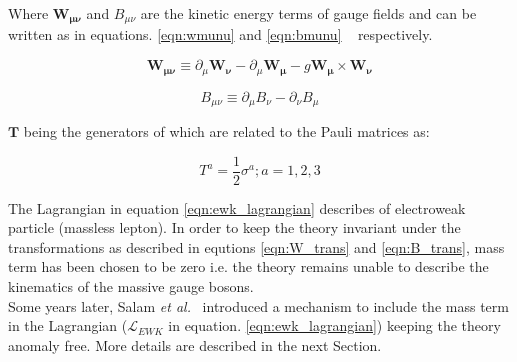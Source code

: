 Where $\mathbf{W_{\mu\nu}}$ and $B_{\mu\nu}$ are the kinetic energy terms of gauge fields and can be written as in equations. \ref{eqn:wmunu} and \ref{eqn:bmunu} ~ respectively.

\begin{equation}
        \mathbf{W_{\mu\nu}} \equiv \partial_{\mu}\mathbf{W_{\nu}}- \partial_{\mu}\mathbf{W_{\mu}} -g\mathbf{W_{\mu}}\times \mathbf{W_{\nu}}   %
\label{eqn:wmunu}
\end{equation}

\begin{equation}
        B_{\mu\nu} \equiv  \partial_{\mu} B_{\nu} - \partial_{\nu} B_{\mu}   %
\label{eqn:bmunu}
\end{equation}

$\mathbf{T}$ being the generators of \sutwo which are related to the Pauli matrices as:

\begin{equation}
	T^{a}=\frac{1}{2}\sigma^{a} ; a=1,2,3
\label{eq:tmatrices}
\end{equation}



The Lagrangian in equation \ref{eqn:ewk_lagrangian} describes of electroweak particle (massless lepton). In order to keep the theory invariant under the transformations as described in equtions \ref{eqn:W_trans} and \ref{eqn:B_trans}, mass term has been chosen to be zero i.e. the theory remains unable to describe the kinematics of the massive gauge bosons.\\
Some years later, Salam \textit{et al.}~ introduced a mechanism to include the mass term in the Lagrangian ($\mathscr{L}_{EWK}$ in equation. \ref{eqn:ewk_lagrangian}) keeping the theory anomaly free. More details are described in the next Section.




